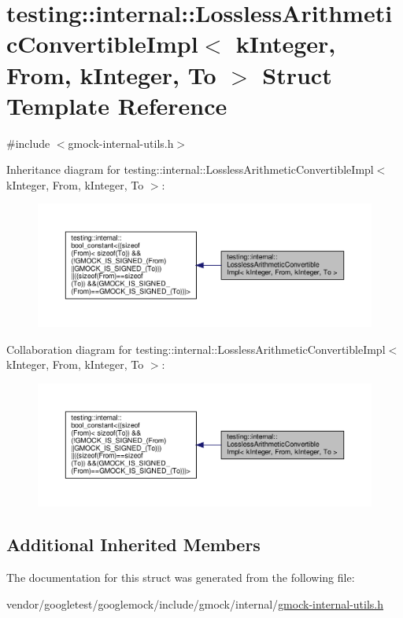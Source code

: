\hypertarget{structtesting_1_1internal_1_1_lossless_arithmetic_convertible_impl_3_01k_integer_00_01_from_00_01k_integer_00_01_to_01_4}{}\section{testing\+:\+:internal\+:\+:Lossless\+Arithmetic\+Convertible\+Impl$<$ k\+Integer, From, k\+Integer, To $>$ Struct Template Reference}
\label{structtesting_1_1internal_1_1_lossless_arithmetic_convertible_impl_3_01k_integer_00_01_from_00_01k_integer_00_01_to_01_4}


{\ttfamily \#include $<$gmock-\/internal-\/utils.\+h$>$}



Inheritance diagram for testing\+:\+:internal\+:\+:Lossless\+Arithmetic\+Convertible\+Impl$<$ k\+Integer, From, k\+Integer, To $>$\+:
\nopagebreak
\begin{figure}[H]
\begin{center}
\leavevmode
\includegraphics[width=350pt]{structtesting_1_1internal_1_1_lossless_arithmetic_convertible_impl_3_01k_integer_00_01_from_00_01a7912276df46b68a7f14881c492b660}
\end{center}
\end{figure}


Collaboration diagram for testing\+:\+:internal\+:\+:Lossless\+Arithmetic\+Convertible\+Impl$<$ k\+Integer, From, k\+Integer, To $>$\+:
\nopagebreak
\begin{figure}[H]
\begin{center}
\leavevmode
\includegraphics[width=350pt]{structtesting_1_1internal_1_1_lossless_arithmetic_convertible_impl_3_01k_integer_00_01_from_00_08df5adb547fa346e1a208b1cc08ffd20}
\end{center}
\end{figure}
\subsection*{Additional Inherited Members}


The documentation for this struct was generated from the following file\+:\begin{DoxyCompactItemize}
\item 
vendor/googletest/googlemock/include/gmock/internal/\hyperlink{gmock-internal-utils_8h}{gmock-\/internal-\/utils.\+h}\end{DoxyCompactItemize}
